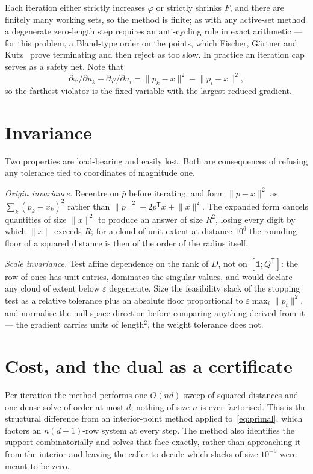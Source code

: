 \documentclass[10pt,a4paper]{article}
\theoremstyle{plain}
\theoremstyle{remark}
\newcommand{\norm}[1]{\lVert #1 \rVert}
\newcommand{\T}{^{\mathsf{T}}}
\begin{document}
Each iteration either strictly increases $\varphi$ or strictly shrinks $F$, and
there are finitely many working sets, so the method is finite; as with any
active-set method a degenerate zero-length step requires an anti-cycling rule in
exact arithmetic --- for this problem, a Bland-type order on the points, which
Fischer, G\"artner and Kutz~\cite{fischer2003} prove terminating and then reject
as too slow. In practice an iteration cap serves as a safety net. Note
that
\begin{equation}
  \label{eq:gradient-note}
  \partial\varphi/\partial u_k-\partial\varphi/\partial u_i
    =\norm{p_k-x}^2-\norm{p_i-x}^2,
\end{equation}
so the farthest violator is the fixed variable with the largest reduced gradient.

\section{Invariance}

Two properties are load-bearing and easily lost. Both are consequences of
refusing any tolerance tied to coordinates of magnitude one.

\emph{Origin invariance.} Recentre on $\bar p$ before iterating, and form
$\norm{p-x}^2$ as $\sum_k(p_k-x_k)^2$ rather than
$\norm{p}^2-2p\T x+\norm{x}^2$. The expanded form cancels quantities of size
$\norm{x}^2$ to produce an answer of size $R^2$, losing every digit by which
$\norm{x}$ exceeds $R$; for a cloud of unit extent at distance $10^6$ the
rounding floor of a squared distance is then of the order of the radius itself.

\emph{Scale invariance.} Test affine dependence on the rank of $D$, not on
$[\mathbf{1};Q\T]$: the row of ones has unit entries, dominates the singular
values, and would declare any cloud of extent below $\varepsilon$ degenerate.
Size the feasibility slack of the stopping test as a relative tolerance plus an
absolute floor proportional to $\varepsilon\max_i\norm{p_i}^2$, and normalise the
null-space direction before comparing anything derived from it --- the gradient
carries units of length$^2$, the weight tolerance does not.

\section{Cost, and the dual as a certificate}

Per iteration the method performs one $O(nd)$ sweep of squared distances and one
dense solve of order at most $d$; nothing of size $n$ is ever factorised. This is
the structural difference from an interior-point method applied
to~\eqref{eq:primal}, which factors an $n(d+1)$-row system at every step. The
method also identifies the support combinatorially and solves that face exactly,
rather than approaching it from the interior and leaving the caller to decide
which slacks of size $10^{-9}$ were meant to be zero.
\end{document}
